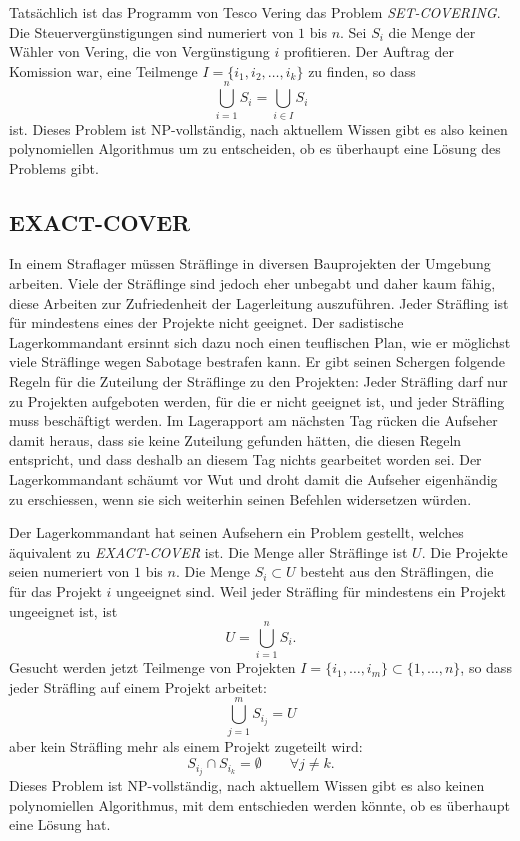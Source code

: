 \medskip

Tatsächlich ist das Programm von Tesco Vering das Problem {\it SET-COVERING}.
Die Steuervergünstigungen sind numeriert von $1$ bis $n$.
Sei $S_i$ die Menge der Wähler von Vering, die von Vergünstigung $i$
profitieren. Der Auftrag der Komission war, eine Teilmenge
$I=\{i_1,i_2,\dots,i_k\}$ zu finden, so dass
\[
\bigcup_{i=1}^nS_i=\bigcup_{i\in I}S_i
\]
ist.
Dieses Problem ist NP-vollständig, nach aktuellem Wissen gibt
es also keinen polynomiellen Algorithmus um zu entscheiden, ob es
überhaupt eine Lösung des Problems gibt.

\subsection{EXACT-COVER}
In einem Straflager müssen Sträflinge in diversen Bauprojekten
der Umgebung arbeiten.
Viele der Sträflinge sind jedoch eher unbegabt und daher kaum
fähig, diese Arbeiten zur Zufriedenheit der Lagerleitung auszuführen.
Jeder Sträfling ist für mindestens eines der Projekte nicht geeignet.
Der sadistische Lagerkommandant ersinnt sich dazu noch einen teuflischen
Plan, wie er möglichst viele Sträflinge wegen Sabotage bestrafen kann.
Er gibt seinen Schergen folgende Regeln für die Zuteilung der Sträflinge
zu den Projekten: Jeder Sträfling darf nur zu Projekten aufgeboten werden,
für die er nicht geeignet ist, und jeder Sträfling muss beschäftigt
werden.
Im Lagerapport am nächsten Tag rücken die Aufseher damit heraus, dass
sie keine Zuteilung gefunden hätten, die diesen Regeln entspricht, und
dass deshalb an diesem Tag nichts gearbeitet worden sei.
Der Lagerkommandant schäumt vor Wut und droht damit die Aufseher eigenhändig
zu erschiessen, wenn sie sich weiterhin seinen Befehlen widersetzen
würden.

\medskip

Der Lagerkommandant hat seinen Aufsehern ein Problem gestellt, welches
äquivalent zu {\it EXACT-COVER} ist.
Die Menge aller Sträflinge ist $U$.
Die Projekte seien numeriert
von $1$ bis $n$. Die Menge $S_i\subset U$ besteht aus den Sträflingen, die
für das Projekt $i$ ungeeignet sind. Weil jeder Sträfling für mindestens
ein Projekt ungeeignet ist, ist 
\[
U=\bigcup_{i=1}^n S_i.
\]
Gesucht werden jetzt Teilmenge von Projekten
$I=\{i_1,\dots,i_m\}\subset\{1,\dots,n\}$, so dass 
jeder Sträfling auf einem Projekt arbeitet:
\[
\bigcup_{j=1}^m S_{i_j}=U
\]
aber kein Sträfling mehr als einem Projekt zugeteilt wird:
\[
S_{i_j}\cap S_{i_k}=\emptyset\qquad \forall j\ne k.
\]
Dieses Problem ist NP-vollständig, nach aktuellem Wissen gibt es
also keinen polynomiellen Algorithmus, mit dem entschieden werden
könnte, ob es überhaupt eine Lösung hat.


